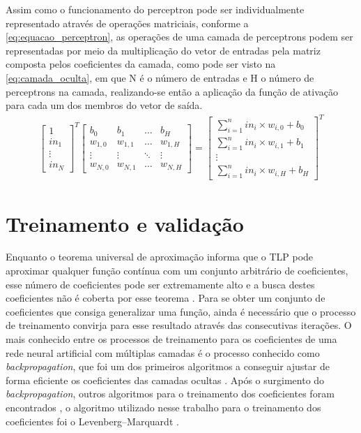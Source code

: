 Assim como o funcionamento do perceptron pode ser individualmente representado através de operações matriciais, conforme a \autoref{eq:equacao_perceptron}, as operações de uma camada de perceptrons podem ser representadas por meio da multiplicação do vetor de entradas pela matriz composta pelos coeficientes da camada, como pode ser visto na \autoref{eq:camada_oculta}, em que N é o número de entradas e H o número de perceptrons na camada, realizando-se então a aplicação da função de ativação para cada um dos membros do vetor de saída.
\begin{align}
\begin{bmatrix}
1 \\ 
in_{1}\\ 
\vdots\\ 
in_{N}
\end{bmatrix}^{T}
\begin{bmatrix}
b_{0}   & b_{1}   & \hdots & b_{H} \\ 
w_{1,0} & w_{1,1} & \hdots & w_{1,H} \\ 
\vdots  & \vdots  & \ddots & \vdots \\ 
w_{N,0} & w_{N,1} & \hdots & w_{N,H}
\end{bmatrix}
=
\begin{bmatrix}
\sum\limits_{i=1}^{n} in_{i} \times w_{i,0} + b_{0}\\ 
\sum\limits_{i=1}^{n} in_{i} \times w_{i,1} + b_{1}\\ 
\vdots\\ 
\sum\limits_{i=1}^{n} in_{i} \times w_{i,H} + b_{H}
\end{bmatrix}^{T}
\label{eq:camada_oculta}
\end{align}

\section{Treinamento e validação} \label{sec:model-trei}
Enquanto o teorema universal de aproximação informa que o TLP pode aproximar qualquer função contínua com um conjunto arbitrário de coeficientes, esse número de coeficientes pode ser extremamente alto e a busca destes coeficientes não é coberta por esse teorema \cite{Goodfellow-et-al-2016}. Para se obter um conjunto de coeficientes que consiga generalizar uma função, ainda é necessário que o processo de treinamento convirja para esse resultado através das consecutivas iterações. O mais conhecido entre os processos de treinamento para os coeficientes de uma rede neural artificial com múltiplas camadas é o processo conhecido como \textit{backpropagation}, que foi um dos primeiros algoritmos a conseguir ajustar de forma eficiente os coeficientes das camadas ocultas \cite{Goodfellow-et-al-2016} \cite{6302929}. Após o surgimento do \textit{backpropagation}, outros algoritmos para o treinamento dos coeficientes foram encontrados \cite{Khidirova2020} \cite{Escalante2006}, o algoritmo utilizado nesse trabalho para o treinamento dos coeficientes foi o Levenberg–Marquardt \cite{Marquardt1963}.

